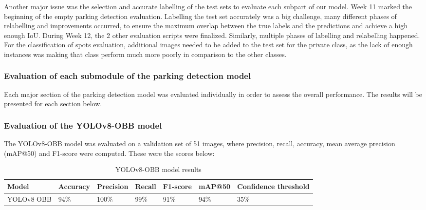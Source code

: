 Another major issue was the selection and accurate labelling of the test sets to evaluate each subpart of our model.
Week 11 marked the beginning of the empty parking detection evaluation. Labelling the test set accurately was a big challenge, many different phases of relabelling and improvements occurred, to ensure the maximum overlap between the true labels and the predictions and achieve a high enough IoU.
During Week 12, the 2 other evaluation scripts were finalized. Similarly, multiple phases of labelling and relabelling happened. For the classification of spots evaluation, additional images needed to be added to the test set for the private class, as the lack of enough instances was making that class perform much more poorly in comparison to the other classes.

\subsubsection{Evaluation of each submodule of the parking detection model}
Each major section of the parking detection model was evaluated individually in order to assess the overall performance. The results will be presented for each section below.

\subsubsection{Evaluation of the YOLOv8-OBB model}
The YOLOv8-OBB model was evaluated on a validation set of 51 images, where precision, recall, accuracy, mean average precision (mAP@50) and F1-score were computed. These were the scores below:
\begin{table}[h!]
  \centering
  \begin{tabular}{|p{}|p{}|p{}|p{}|p{}|p{}|p{}|}
    \hline
    \textbf{Model} & \textbf{Accuracy} & \textbf{Precision} & \textbf{Recall} & \textbf{F1-score} & \textbf{mAP@50} & \textbf{Confidence threshold} \\
    \hline
    YOLOv8-OBB     & 94\%              & 100\%              & 99\%            & 91\%              & 94\%            & 35\%                          \\
    \hline
  \end{tabular}
  \caption{YOLOv8-OBB model results}
\end{table}\\


